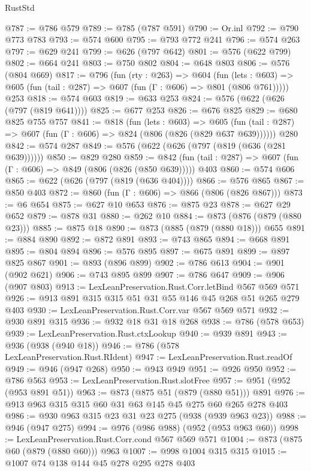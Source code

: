 \begin{lexlean}{RustStd}
\begin{coremodule}
@787 := @786 @579
@789 := @785 (@787 @591)
@790 := Or.inl
@792 := @790 @773 @783
@793 := @574 @600
@795 := @793 @772 @241
@796 := @574 @263
@797 := @629 @241
@799 := @626 (@797 @642)
@801 := @576 (@622 @799)
@802 := @664 @241
@803 := @750 @802
@804 := @648 @803
@806 := @576 (@804 @669)
@817 := @796
    (fun (rty : @263) =>
    @604
      (fun (lets : @603) => @605 (fun (tail : @287) => @607 (fun (Γ : @606) => @801 (@806 @761)))))
    @253
@818 := @574 @603
@819 := @633 @253
@824 := @576 (@622 (@626 (@797 (@819 @641))))
@825 := @677 @253
@826 := @676 @825
@829 := @680 @825 @755 @757
@841 := @818
    (fun (lets : @603) =>
    @605 (fun (tail : @287) => @607 (fun (Γ : @606) => @824 (@806 (@826 (@829 @637 @639))))))
    @280
@842 := @574 @287
@849 := @576 (@622 (@626 (@797 (@819 (@636 (@281 @639))))))
@850 := @829 @280
@859 := @842 (fun (tail : @287) => @607 (fun (Γ : @606) => @849 (@806 (@826 (@850 @639))))) @403
@860 := @574 @606
@865 := @622 (@626 (@797 (@819 (@636 @404))))
@866 := @576 @865
@867 := @850 @403
@872 := @860 (fun (Γ : @606) => @866 (@806 (@826 @867)))
@873 := @6 @654
@875 := @627 @10 @653
@876 := @875 @23
@878 := @627 @29 @652
@879 := @878 @31
@880 := @262 @10
@884 := @873 (@876 (@879 (@880 @23)))
@885 := @875 @18
@890 := @873 (@885 (@879 (@880 @18))) @655
@891 := @884 @890
@892 := @872 @891
@893 := @743 @865
@894 := @668 @891
@895 := @804 @894
@896 := @576 @895
@897 := @675 @891
@899 := @897 @825 @867
@901 := @893 (@896 @899)
@902 := @786 @613
@904 := @901 (@902 @621)
@906 := @743 @895 @899
@907 := @786 @647
@909 := @906 (@907 @803)
@913 := LexLeanPreservation.Rust.Corr.letBind @567 @569 @571
@926 := @913 @891 @315 @315 @51 @31 @55 @146 @45 @268 @51 @265 @279 @403
@930 := LexLeanPreservation.Rust.Corr.var @567 @569 @571
@932 := @930 @891 @315
@936 := @932 @18 @31 @18 @268
@938 := @786 (@578 @653)
@939 := LexLeanPreservation.Rust.ctxLookup
@940 := @939 @891
@943 := @936 (@938 (@940 @18))
@946 := @786 (@578 LexLeanPreservation.Rust.RIdent)
@947 := LexLeanPreservation.Rust.readOf
@949 := @946 (@947 @268)
@950 := @943 @949
@951 := @926 @950
@952 := @786 @563
@953 := LexLeanPreservation.Rust.slotFree
@957 := @951 (@952 (@953 @891 @51))
@963 := @873 (@875 @51 (@879 (@880 @51))) @891
@976 := @913 @963 @315 @315 @60 @31 @63 @145 @45 @275 @60 @265 @278 @403
@986 := @930 @963 @315 @23 @31 @23 @275 (@938 (@939 @963 @23))
@988 := @946 (@947 @275)
@994 := @976 (@986 @988) (@952 (@953 @963 @60))
@998 := LexLeanPreservation.Rust.Corr.cond @567 @569 @571
@1004 := @873 (@875 @60 (@879 (@880 @60))) @963
@1007 := @998 @1004 @315 @315
@1015 := @1007 @74 @138 @144 @45 @278 @295 @278 @403

\end{coremodule}
\end{lexlean}
